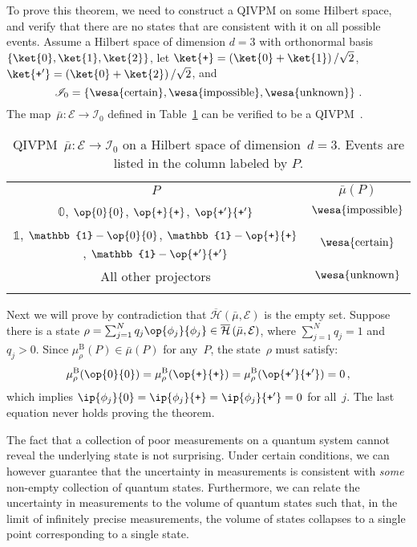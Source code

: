 \documentclass[english,reprint, aps, prl,superscriptaddress, showpacs,
showkeys, longbibliography, amsmath, amssymb, floatfix]{revtex4-1}
\theoremstyle{plain}
\theoremstyle{definition}
\newcommand{\Hilb}{\mathcal{H}}
\newcommand{\events}{\ensuremath{\mathcal{E}}}
\newcommand{\imposs}{{\text{\wesa{impossible}}}}
\newcommand{\necess}{{\text{\wesa{certain}}}}
\newcommand{\unknown}{{\text{\wesa{unknown}}}}
\newcommand{\proj}[1]{\op{#1}{#1}}
\newcommand{\ps}{\texttt{+}}
\newcommand{\coreBorn}{\ensuremath{\overline{\Hilb}}}
\begin{document}
To prove this theorem, we need to construct a QIVPM on some Hilbert
space, and verify that there are no states that are consistent with it
on all possible events. Assume a Hilbert space of dimension $d=3$ with
orthonormal basis $\left\{ \ket{0},\ket{1},\ket{2}\right\} $, let
$\ket{\ps}=\left(\ket{0}+\ket{1}\right)/\sqrt{2}$,
$\ket{\ps'}=\left(\ket{0}+\ket{2}\right)/\sqrt{2}$, and
\begin{equation}
\mathscr{I}_{0}=\left\{ \necess,\imposs,\unknown\right\} \,.\label{eq:3-value-intervals}
\end{equation}
The map~$\bar{\mu}:\events\rightarrow\mathscr{I}_{0}$ defined in
Table~\ref{tab:non-Born-QIVPM} can be verified to be a
QIVPM~\citep{HOSTunpublished}.
\begin{table}
\caption{\label{tab:non-Born-QIVPM}QIVPM~$\bar{\mu}:\events\rightarrow\mathscr{I}_{0}$
on a Hilbert space of dimension~$d=3$. Events are listed in the column
labeled by $P$.}

\begin{tabular}{cc}
\toprule 
\addlinespace
$P$ & $\bar{\mu}\left(P\right)$\tabularnewline\addlinespace
\midrule
\midrule 
\addlinespace
$\mathbb{0}$, $\proj{0}$, $\proj{\ps}$, $\proj{\ps'}$ & $\imposs$\tabularnewline\addlinespace
\midrule 
\addlinespace
$\mathbb{1}$, $\mathbb{1}-\proj{0}$, $\mathbb{1}-\proj{\ps}$, 
$\mathbb{1}-\proj{\ps'}$ & $\necess$\tabularnewline\addlinespace
\midrule 
\addlinespace
All other projectors & $\unknown$\tabularnewline\addlinespace
\bottomrule
\end{tabular}
\end{table}
Next we will prove by contradiction that
$\coreBorn\left(\bar{\mu},\events\right)$ is the empty set. Suppose
there is a state
$\rho=\sum_{j=1}^{N}q_{j}\proj{\phi_{j}}\in\coreBorn\left(\bar{\mu},\events\right)$,
where $\sum_{j=1}^{N}q_{j}=1$ and $q_{j} > 0$. Since
$\mu_{\rho}^{\mathrm{B}}(P)\in\bar{\mu}(P)$ for any~$P$, the
state~$\rho$ must satisfy:
\begin{equation}
\mu_{\rho}^{\mathrm{B}}(\proj{0})=\mu_{\rho}^{\mathrm{B}}(\proj{\ps})=\mu_{\rho}^{\mathrm{B}}(\proj{\ps'})=0\,,
\end{equation}
which implies $\ip{\phi_{j}}{0}=\ip{\phi_{j}}{\ps}=\ip{\phi_{j}}{\ps'}=0$
for all~$j$. The last equation never holds proving the theorem.

The fact that a collection of poor measurements on a quantum system
cannot reveal the underlying state is not surprising. Under certain
conditions, we can however guarantee that the uncertainty in
measurements is consistent with \emph{some} non-empty collection of
quantum states. Furthermore, we can relate the uncertainty in
measurements to the volume of quantum states such that, in the limit
of infinitely precise measurements, the volume of states collapses to
a single point corresponding to a single state.
\end{document}
